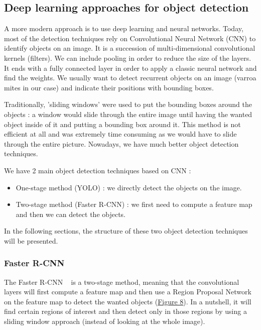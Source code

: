 \documentclass{article}
\begin{document}
\newpage
\subsection{Deep learning approaches for object detection}
A more modern approach is to use deep learning and neural networks.
Today, most of the detection techniques rely on Convolutional Neural Network (CNN) to identify objects on an image. It is a succession of multi-dimensional convolutional kernels (filters). We can include pooling in order to reduce the size of the layers. It ends with a fully connected layer in order to apply a classic neural network and find the weights.
We usually want to detect recurrent objects on an image (varroa mites in our case) and indicate their positions with bounding boxes.

\bigskip
\bigskip

Traditionally, 'sliding windows' were used to put the bounding boxes around the objects : a window would slide through the entire image until having the wanted object inside of it and putting a bounding box around it. This method is not efficient at all and was extremely time consuming as we would have to slide through the entire picture. Nowadays, we have much better object detection techniques.

\bigskip
\bigskip

We have 2 main object detection techniques based on CNN : 

\begin{itemize}
    \item One-stage method (YOLO) : we directly detect the objects on the image.
    \item Two-stage method (Faster R-CNN) : we first need to compute a feature map and then we can detect the objects.
\end{itemize}

\bigskip
In the following sections, the structure of these two object detection techniques will be presented.


\subsubsection{Faster R-CNN}

The Faster R-CNN ~\cite{ren2015faster} is a two-stage method, meaning that the convolutional layers will first compute a feature map and then use a Region Proposal Network on the feature map to detect the wanted objects (\hyperref[Figure 8]{Figure 8}). In a nutshell, it will find certain regions of interest and then detect only in those regions by using a sliding window approach (instead of looking at the whole image).
\end{document}
